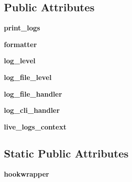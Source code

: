 \subsection*{Public Attributes}
\begin{DoxyCompactItemize}
\item 
\mbox{\label{class__pytest_1_1logging_1_1_logging_plugin_aabc3a899a52f46df280bc95faaf10305}} 
{\bfseries print\+\_\+logs}
\item 
\mbox{\label{class__pytest_1_1logging_1_1_logging_plugin_a149ae8cd8abe7036fa96682851f23dea}} 
{\bfseries formatter}
\item 
\mbox{\label{class__pytest_1_1logging_1_1_logging_plugin_a30f568c0f020301354e91c179a14a78e}} 
{\bfseries log\+\_\+level}
\item 
\mbox{\label{class__pytest_1_1logging_1_1_logging_plugin_a42c76725b56cc5c7d60b07a3df50e8f3}} 
{\bfseries log\+\_\+file\+\_\+level}
\item 
\mbox{\label{class__pytest_1_1logging_1_1_logging_plugin_aca234d241cd9902bd263b50a8075c21b}} 
{\bfseries log\+\_\+file\+\_\+handler}
\item 
\mbox{\label{class__pytest_1_1logging_1_1_logging_plugin_af29b1c51516710898ffa000a4c865d19}} 
{\bfseries log\+\_\+cli\+\_\+handler}
\item 
\mbox{\label{class__pytest_1_1logging_1_1_logging_plugin_a3a8c9824d3418dbfc732ee1bdb22c930}} 
{\bfseries live\+\_\+logs\+\_\+context}
\end{DoxyCompactItemize}
\subsection*{Static Public Attributes}
\begin{DoxyCompactItemize}
\item 
\mbox{\label{class__pytest_1_1logging_1_1_logging_plugin_a39bbb0d0d02d9b570fddaed42aa2554a}} 
{\bfseries hookwrapper}
\end{DoxyCompactItemize}


